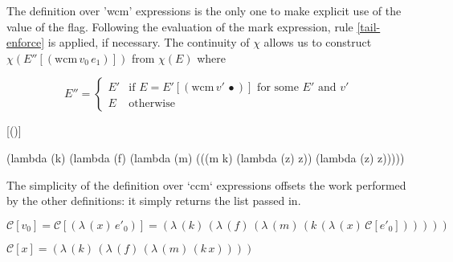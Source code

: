 \documentclass{llncs}
\newcommand{\lv}[0]{$\lambda_v$}
\newcommand{\wcm}[2]{(\mathrm{wcm}\,#1\,#2)}
\newcommand{\ccm}[0]{(\mathrm{ccm})}
\newcommand{\app}[2]{(#1\,#2)}
\newcommand{\abs}[2]{(\lambda\,(#1)\,#2)}
\newcommand{\hole}[0]{\bullet}
\newcommand{\C}[1]{\mathcal{C}[#1]}
\begin{document}
The definition over \scheme'wcm' expressions is the only one to make explicit use of the value of the flag. Following the evaluation of the mark expression, rule \ref{tail-enforce} is applied, if necessary. The continuity of $\chi$ allows us to construct $\chi(E''[\wcm{v_0}{e_1}])$ from $\chi(E)$ where 

\begin{equation}
E''=\begin{cases}
E' &\text{if $E=E'[\wcm{v'}{\hole}]$ for some $E'$ and $v'$}\\
E &\text{otherwise}
\end{cases}
\end{equation}

\begin{schemedefn}{\C{\ccm}}
\begin{schemedisplay}
(lambda (k)
  (lambda (f)
    (lambda (m)
      (((m k) (lambda (z) z)) (lambda (z) z)))))
\end{schemedisplay}
\end{schemedefn}

The simplicity of the definition over \scheme`ccm` expressions offsets the work performed by the other definitions: it simply returns the list passed in.

\begin{definition}
$\C{v_0}=\C{\abs{x}{e'_0}}=\abs{k}{\abs{f}{\abs{m}{\app{k}{\abs{x}{\C{e'_0}}}}}}$
\end{definition}

\begin{definition}
$\C{x}=\abs{k}{\abs{f}{\abs{m}{\app{k}{x}}}}$
\end{definition}



\end{document}
